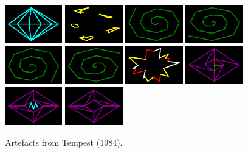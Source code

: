 \begin{figure}[H]
    \includegraphics[width=2.5cm]{preface/vector_images/vec_image_sa4pic.png}
    \includegraphics[width=2.5cm]{preface/vector_images/vec_image_shrap.png}
    \includegraphics[width=2.5cm]{preface/vector_images/vec_image_spira1.png}
    \includegraphics[width=2.5cm]{preface/vector_images/vec_image_spira2.png}
    \includegraphics[width=2.5cm]{preface/vector_images/vec_image_spira3.png}
    \includegraphics[width=2.5cm]{preface/vector_images/vec_image_spira4.png}
    \includegraphics[width=2.5cm]{preface/vector_images/vec_image_splat.png}
    \includegraphics[width=2.5cm]{preface/vector_images/vec_image_tankf.png}
    \includegraphics[width=2.5cm]{preface/vector_images/vec_image_tankp.png}
    \includegraphics[width=2.5cm]{preface/vector_images/vec_image_tankr.png}
  \caption*{Artefacts from Tempest (1984).}
\end{figure}
\vspace*{\fill}
\clearpage


